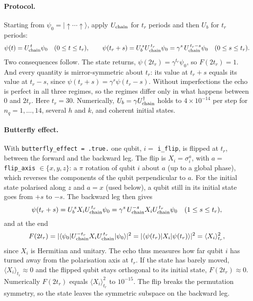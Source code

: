 \documentclass[11pt,a4paper]{article}
\begin{document}
\paragraph{Protocol.}
Starting from $\psi_0=|{\uparrow\cdots\uparrow}\rangle$, apply $U_{\rm chain}$ for $t_r$ periods and then $U_b$ for
$t_r$ periods:
\begin{equation}
  \psi(t) = U_{\rm chain}^{\,t}\psi_0\quad (0\le t\le t_r),\qquad
  \psi(t_r+s) = U_b^{\,s}U_{\rm chain}^{\,t_r}\psi_0 = \gamma^s\,U_{\rm chain}^{\,t_r-s}\psi_0
  \quad(0\le s\le t_r).
\end{equation}
Two consequences follow. The state returns, $\psi(2t_r)=\gamma^{t_r}\psi_0$, so $F(2t_r)=1$. And every quantity is
mirror-symmetric about $t_r$: its value at $t_r+s$ equals its value at $t_r-s$, since $\psi(t_r+s)=\gamma^s\psi(t_r-s)$.
Without imperfections the echo is perfect in all three regimes, so the regimes differ only in what happens between
$0$ and $2t_r$. Here $t_r=30$. Numerically, $U_b=\gamma U_{\rm chain}^\dagger$ holds to $4\times10^{-14}$ per step for
$n_q=1,\dots,14$, several $h$ and $k$, and coherent initial states.

\paragraph{Butterfly effect.}
With \texttt{butterfly\_effect = .true.} one qubit, $i=$ \texttt{i\_flip}, is flipped at $t_r$, between the forward
and the backward leg. The flip is $X_i=\sigma^a_i$, with $a=$ \texttt{flip\_axis} $\in\{x,y,z\}$: a $\pi$ rotation of
qubit $i$ about $a$ (up to a global phase), which reverses the components of the qubit perpendicular to $a$. For the
initial state polarised along $z$ and $a=x$ (used below), a qubit still in its initial state goes from $+s$ to $-s$.
The backward leg then gives
\begin{equation}
  \psi(t_r+s) = U_b^{\,s}X_iU_{\rm chain}^{\,t_r}\psi_0 = \gamma^s\,U_{\rm chain}^{-s}X_iU_{\rm chain}^{\,t_r}\psi_0
  \quad(1\le s\le t_r),
\end{equation}
and at the end
\begin{equation}
  F(2t_r) = |\langle\psi_0|U_{\rm chain}^{-t_r}X_iU_{\rm chain}^{\,t_r}|\psi_0\rangle|^2
  = |\langle\psi(t_r)|X_i|\psi(t_r)\rangle|^2 = \langle X_i\rangle_{t_r}^2 ,
\end{equation}
since $X_i$ is Hermitian and unitary. The echo thus measures how far qubit $i$ has turned away from the polarisation
axis at $t_r$. If the state has barely moved, $\langle X_i\rangle_{t_r}\approx0$ and the flipped qubit stays orthogonal
to its initial state, $F(2t_r)\approx0$. Numerically $F(2t_r)$ equals $\langle X_i\rangle_{t_r}^2$ to $10^{-15}$. The
flip breaks the permutation symmetry, so the state leaves the symmetric subspace on the backward leg.
\end{document}
